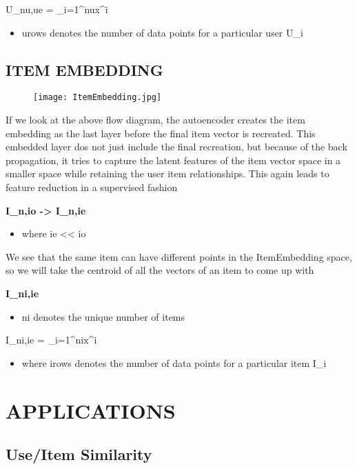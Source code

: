 \documentclass[letterpaper,twocolumn,10pt]{article}
\begin{document}
U_{nu,ue} = \sum_{i=1}^{nu}{x^i} 

\begin{itemize}
\item urows denotes the number of data points for a particular user U_{i}
\end{itemize}


\subsection {ITEM EMBEDDING}

\begin{figure}[h!]
\texttt{[image: ItemEmbedding.jpg]}
\end{figure}

If we look at the above flow diagram, the autoencoder creates the item embedding as the last layer before the final item vector is recreated. This embedded layer dos not just include the final recreation, but because of the back propagation, it tries to capture the latent features of the item vector space in a smaller space while retaining the user item relationships. This again leads to feature reduction in a supervised fashion

\textbf{I_{n,io} -> I_{n,ie} }
\begin{itemize}
\item where ie << io
\end{itemize}

We see that the same item can have different points in the ItemEmbedding space, so we will take the centroid of all the vectors of an item to come up with 

\textbf{I_{ni,ie}}
\begin{itemize}
\item ni denotes the unique number of items
\end{itemize}

I_{ni,ie} = \sum_{i=1}^{ni}{x^i} 
\begin{itemize}
\item where irows denotes the number of data points for a particular item I_{i}
\end{itemize}

\section{APPLICATIONS}
\subsection{Use/Item Similarity}
\end{document}
